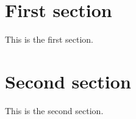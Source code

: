 \documentclass{article}
\begin{document}
\section{First section}
This is the first section.

\section{Second section}
This is the second section.
\end{document}
